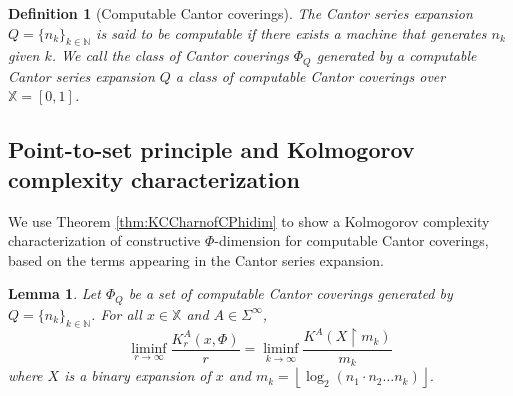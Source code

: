 \documentclass[11pt]{article}
\newtheorem{lemma}{Lemma}
\newtheorem{definition}{Definition}
\newcommand{\floor}[1]{ \left\lfloor #1 \right\rfloor }
\newcommand{\restr}{\upharpoonright}
\newcommand{\N}{\mathbb{N}}
\newcommand{\X}{{\mathbb{X}}}
\newcommand{\x}{x}
\begin{document}
\begin{definition}[Computable Cantor coverings]
	The Cantor series expansion $Q = \{n_k\}_{k \in \N}$ is said to be computable if there exists a machine that generates $n_k$ given $k$. We call the class of Cantor coverings $\Phi_Q$ generated by a computable Cantor series expansion $Q$ a class of \emph{computable Cantor coverings} over $\X = [0,1]$.
\end{definition}


\subsection{Point-to-set principle and Kolmogorov complexity characterization}


We use Theorem \ref{thm:KCCharnofCPhidim} to show a Kolmogorov complexity characterization of constructive $\Phi$-dimension for computable Cantor coverings, based on the terms appearing in the Cantor series expansion.


\begin{lemma}\label{lem:KCChanging}
	Let $\Phi_Q$ be a set of computable Cantor coverings 
	generated by $Q = \{n_k\}_{k \in \N}$. For all $x \in \X$ and $A \in \Sigma^\infty$,
	$$ \liminf_{r \rightarrow \infty} \frac{K_r^A(\x, \Phi)}{r} = \liminf\limits_{k\to\infty} \frac{K^A(X
		\restr m_k)}{m_k}$$ where $X$ is a binary
	expansion of $x$ and $m_k = \floor{\log_2(n_1 \cdot n_2 \dots
		n_k)}.$
\end{lemma}
\end{document}
